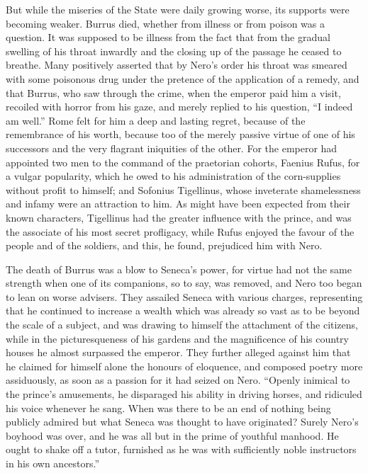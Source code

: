 But while the miseries of the State were daily growing worse, its supports were becoming weaker. Burrus died, whether from illness or from poison was a question. It was supposed to be illness from the fact that from the gradual swelling of his throat inwardly and the closing up of the passage he ceased to breathe. Many positively asserted that by Nero's order his throat was smeared with some poisonous drug under the pretence of the application of a remedy, and that Burrus, who saw through the crime, when the emperor paid him a visit, recoiled with horror from his gaze, and merely replied to his question, ``I indeed am well.'' Rome felt for him a deep and lasting regret, because of the remembrance of his worth, because too of the merely passive virtue of one of his successors and the very flagrant iniquities of the other. For the emperor had appointed two men to the command of the praetorian cohorts, Faenius Rufus, for a vulgar popularity, which he owed to his administration of the corn-supplies without profit to himself; and Sofonius Tigellinus, whose inveterate shamelessness and infamy were an attraction to him. As might have been expected from their known characters, Tigellinus had the greater influence with the prince, and was the associate of his most secret profligacy, while Rufus enjoyed the favour of the people and of the soldiers, and this, he found, prejudiced him with Nero.


The death of Burrus was a blow to Seneca's power, for virtue had not the same strength when one of its companions, so to say, was removed, and Nero too began to lean on worse advisers. They assailed Seneca with various charges, representing that he continued to increase a wealth which was already so vast as to be beyond the scale of a subject, and was drawing to himself the attachment of the citizens, while in the picturesqueness of his gardens and the magnificence of his country houses he almost surpassed the emperor. They further alleged against him that he claimed for himself alone the honours of eloquence, and composed poetry more assiduously, as soon as a passion for it had seized on Nero. ``Openly inimical to the prince's amusements, he disparaged his ability in driving horses, and ridiculed his voice whenever he sang. When was there to be an end of nothing being publicly admired but what Seneca was thought to have originated? Surely Nero's boyhood was over, and he was all but in the prime of youthful manhood. He ought to shake off a tutor, furnished as he was with sufficiently noble instructors in his own ancestors.''

